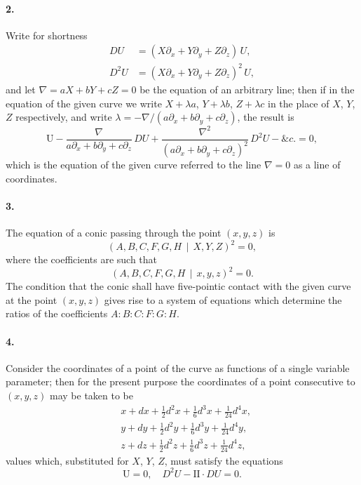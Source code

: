 \documentclass[12pt,a4paper]{article}
\theoremstyle{plain}
\begin{document}
\paragraph{2.}
Write  for  shortness
\begin{align*}
DU &= (X\partial_x + Y\partial_y + Z\partial_z) \, U, \\
D^2 U &= (X\partial_x + Y\partial_y + Z\partial_z)^2 \, U,
\end{align*}
and  let  $\nabla = aX + bY + cZ = 0$  be  the  equation  of  an  arbitrary  line;  then  if  in  the  equation
of  the  given  curve  we  write  $X + \lambda a$,  $Y + \lambda b$,  $Z + \lambda c$  in  the  place  of  $X$,  $Y$,  $Z$
respectively,  and  write  $\lambda = -\nabla / (a\partial_x + b\partial_y + c\partial_z)$,  the  result  is
\[
\mathrm{U} - \frac{\nabla}{a\partial_x + b\partial_y + c\partial_z} \, DU
  + \frac{\nabla^2}{(a\partial_x + b\partial_y + c\partial_z)^2} \, D^2 U - \&c. = 0,
\]
which  is  the  equation  of  the  given  curve  referred  to  the  line  $\nabla = 0$  as  a  line  of  coordinates.

\paragraph{3.}
The  equation  of  a  conic  passing  through  the  point  $(x, y, z)$  is
\[
(A, B, C, F, G, H \,\!\!\mid\, X, Y, Z)^2 = 0,
\]
where  the  coefficients  are  such  that
\[
(A, B, C, F, G, H \,\!\!\mid\, x, y, z)^2 = 0.
\]
The  condition  that  the  conic  shall  have  five-pointic  contact  with  the  given  curve  at  the
point  $(x, y, z)$  gives  rise  to  a  system  of  equations  which  determine  the  ratios  of  the
coefficients  $A : B : C : F : G : H$.


\paragraph{4.}
Consider  the  coordinates  of  a  point  of  the  curve  as  functions  of  a  single
variable  parameter;  then  for  the  present  purpose  the  coordinates  of  a  point  consecutive
to  $(x, y, z)$  may  be  taken  to  be
\begin{align*}
&x + dx + \tfrac{1}{2}d^2x + \tfrac{1}{6}d^3x + \tfrac{1}{24}d^4x, \\
&y + dy + \tfrac{1}{2}d^2y + \tfrac{1}{6}d^3y + \tfrac{1}{24}d^4y, \\
&z + dz + \tfrac{1}{2}d^2z + \tfrac{1}{6}d^3z + \tfrac{1}{24}d^4z,
\end{align*}
values  which,  substituted  for  $X$,  $Y$,  $Z$,  must  satisfy  the  equations
\[
\mathrm{U} = 0, \quad D^2 U - \mathrm{II} \cdot DU = 0.
\]
\end{document}
